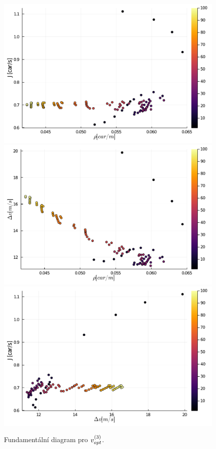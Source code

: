 \documentclass[a4paper, 12pt, fleqn]{article}
\begin{document}
\begin{figure}
	\centering
	\begin{minipage}[c]{0.7\textwidth}
		\centering
		\vspace*{\fill}
		\includegraphics[width=\textwidth]{images/FD_RJ_vopt5.pdf}
		\includegraphics[width=\textwidth]{images/FD_RV_vopt5.pdf}
		\includegraphics[width=\textwidth]{images/FD_VJ_vopt5.pdf}
	\end{minipage}
	\caption{Fundamentální diagram pro $v_{opt}^{(3)}$.}
	\label{Obr: FD vopt3}
\end{figure}
\end{document}
